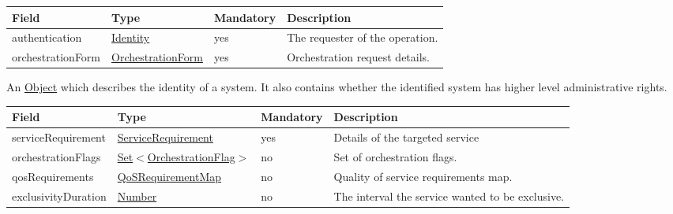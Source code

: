 \documentclass[a4paper]{arrowhead}
\newcommand{\pref}[1]{{\textcolor{ArrowheadGrey}{\hyperref[sec:model:primitives:#1]{#1}}}}
\begin{document}
{}
 
\begin{table}[ht!]
\begin{tabularx}{\textwidth}{| p{3.25cm} | p{3.5cm} | p{2cm} | X |} \hline
\rowcolor{gray!33} Field & Type & Mandatory & Description \\ \hline
authentication & \hyperref[sec:model:Identity]{Identity} & yes & The requester of the operation. \\ \hline
orchestrationForm & \hyperref[sec:model:OrchestrationForm]{OrchestrationForm} & yes & Orchestration request details. \\ \hline
\end{tabularx}
\end{table}


An \pref{Object} which describes the identity of a system. It also contains whether the identified system has higher level administrative rights.


\begin{table}[ht!]
\begin{tabularx}{\textwidth}{| p{3.25cm} | p{3.8cm} | p{2cm} | X |} \hline
\rowcolor{gray!33} Field & Type & Mandatory & Description \\ \hline
serviceRequirement & \hyperref[sec:model:ServiceRequirement]{ServiceRequirement} & yes & Details of the targeted service \\ \hline
orchestrationFlags & \pref{Set}$<$\hyperref[sec:model:OrchestrationFlag]{OrchestrationFlag}$>$ & no & Set of orchestration flags. \\ \hline
qosRequirements & \hyperref[sec:model:QoSRequirementMap]{QoSRequirementMap} & no & Quality of service requirements map. \\ \hline
exclusivityDuration & \pref{Number} & no & The interval the service wanted to be exclusive.  \\ \hline
\end{tabularx}
\end{table}

\clearpage

\end{document}
